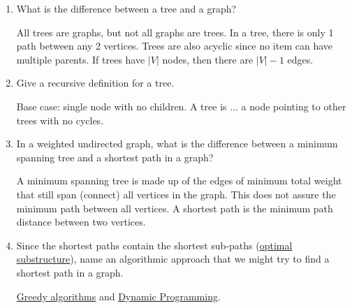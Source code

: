\documentclass[26]{cs430lecture}
\begin{document}
\maketitle
\openingquestions
\begin{enumerate}
	\item What is the difference between a tree and a graph?
	\begin{newanswer}
		All trees are graphs, but not all graphs are trees.
		In a tree, there is only 1 path between any 2 vertices.
		Trees are also acyclic since no item can have multiple parents.
		If trees have $|V|$ nodes, then there are $|V|-1$ edges.
	\end{newanswer}
	\item Give a recursive definition for a tree.
	\begin{newanswer}
		Base case: single node with no children.
		A tree is $\dots$ a node pointing to other trees with no cycles.
	\end{newanswer}
	\item In a weighted undirected graph, what is the difference between a minimum spanning tree and a shortest path in a graph?
	\begin{newanswer}
		A minimum spanning tree is made up of the edges of minimum total weight that still span (connect) all vertices in the graph.
		This does not assure the minimum path between all vertices.
		A shortest path is the minimum path distance between two vertices.
	\end{newanswer}
	\item Since the shortest paths contain the shortest sub-paths (\hyperref[dfn:optimal-substructure]{optimal substructure}),
	name an algorithmic approach that we might try to find a shortest path in a graph.
	\begin{newanswer}
		\hyperref[sec:proving-a-greedy-choice-property]{Greedy algorithms} and \hyperref[sec:dynamic-programming]{Dynamic Programming}.
	\end{newanswer}
\end{enumerate}
\end{document}
